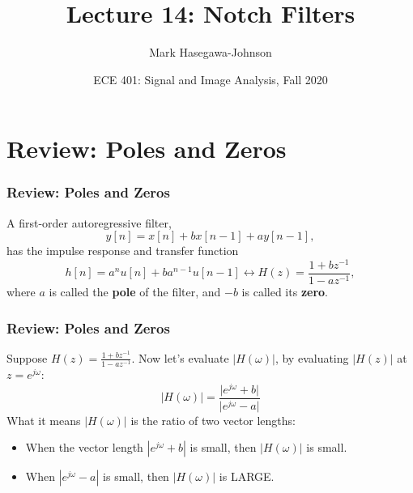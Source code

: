 \documentclass{beamer}
\title{Lecture 14: Notch Filters}
\author{Mark Hasegawa-Johnson}
\date{ECE 401: Signal and Image Analysis, Fall 2020}
\begin{document}
\begin{frame}
  \maketitle
\end{frame}

\begin{frame}
  \tableofcontents
\end{frame}

\section[Review]{Review: Poles and Zeros}
\setcounter{subsection}{1}

\begin{frame}
  \frametitle{Review: Poles and Zeros}
  A first-order autoregressive filter,
  \[
  y[n] = x[n]+bx[n-1]+ay[n-1],
  \]
  has the impulse response and transfer function
  \[
  h[n]=a^n u[n]+ba^{n-1}u[n-1] \leftrightarrow H(z)  = \frac{1+bz^{-1}}{1-az^{-1}},
  \]
  where $a$ is called the {\bf pole} of the filter, and $-b$ is called
  its {\bf zero}.
\end{frame}

\begin{frame}
  \frametitle{Review: Poles and Zeros}

  Suppose $H(z)=\frac{1+bz^{-1}}{1-az^{-1}}$.  Now let's evaluate
  $|H(\omega)|$, by evaluating $|H(z)|$ at $z=e^{j\omega}$:
  \[
  \vert H(\omega)\vert = 
  \frac{\vert e^{j\omega}+b\vert}{\vert e^{j\omega}-a\vert}
  \]
  What it means $|H(\omega)|$ is the ratio of two vector lengths:
  \begin{itemize}
  \item When the vector length $|e^{j\omega}+b|$ is small, then
    $|H(\omega)|$ is small.
  \item When $|e^{j\omega}-a|$ is small, then $|H(\omega)|$ is LARGE.
  \end{itemize}
\end{frame}
\end{document}
